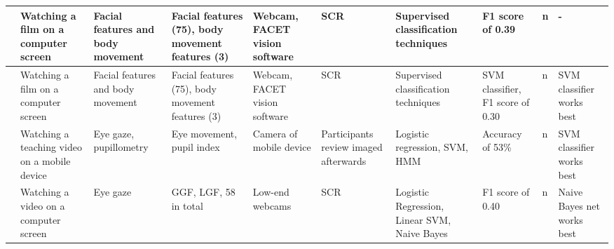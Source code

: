 \begin{landscape}
\begin{xtabular}{p{25mm}p{25mm}p{30mm}p{18mm}p{32mm}p{22mm}p{2cm}p{2cm}p{15mm}p{32cm}}
  \cite{Stewart2017FaceComprehension}     & Watching a film on a computer screen & Facial features and body movement & Facial features (75), body movement features (3) & Webcam, FACET vision software & SCR & Supervised classification techniques & F1 score of 0.39 & n & -\\\hline
  \cite{Stewart2016WheresViewing}         & Watching a film on a computer screen & Facial features and body movement & Facial features (75), body movement features (3) & Webcam, FACET vision software & SCR & Supervised classification techniques & SVM classifier, F1 score of 0.30 & n & SVM classifier works best\\\hline
  \cite{ISI:000443429900018}              & Watching a teaching video on a mobile device & Eye gaze, pupillometry & Eye movement, pupil index & Camera of mobile device & Participants review imaged afterwards & Logistic regression, SVM, HMM & Accuracy of 53\% & n & SVM classifier works best\\\hline
  \cite{Zhao2017ScalableApproach}         & Watching a video on a computer screen & Eye gaze & GGF, LGF, 58 in total & Low-end webcams & SCR & Logistic Regression, Linear SVM, Naive Bayes & F1 score of 0.40 & n & Naive Bayes net works best\\\hline
  \bottomrule
\end{xtabular}
\end{landscape}
\restoregeometry
\twocolumn